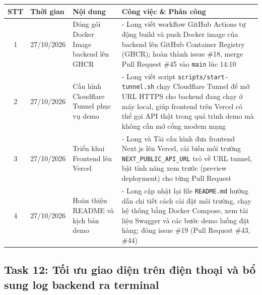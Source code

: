 \documentclass[12pt, a4paper]{article}
\begin{document}
\begin{tabularx}{\textwidth}{|c|p{3.2cm}|Y|Y|}
    \hline
    \textbf{STT} & \textbf{Thời gian} & \textbf{Nội dung} & \textbf{Công việc \& Phân công} \\
    \hline

    1 & 27/10/2026 & Đóng gói Docker Image backend lên GHCR &
    - Long viết workflow GitHub Actions tự động build và push Docker image của backend lên GitHub Container Registry (GHCR); hoàn thành issue \#18, merge Pull Request \#45 vào \texttt{main} lúc 14:10 \\
    \hline

    2 & 27/10/2026 & Cấu hình Cloudflare Tunnel phục vụ demo &
    - Long viết script \texttt{scripts/start-tunnel.sh} chạy Cloudflare Tunnel để mở URL HTTPS cho backend đang chạy ở máy local, giúp frontend trên Vercel có thể gọi API thật trong quá trình demo mà không cần mở cổng modem mạng \\
    \hline

    3 & 27/10/2026 & Triển khai Frontend lên Vercel &
    - Long và Tài cấu hình đưa frontend Next.js lên Vercel, cài biến môi trường \texttt{NEXT\_PUBLIC\_API\_URL} trỏ về URL tunnel, bật tính năng xem trước (preview deployment) cho từng Pull Request \\
    \hline

    4 & 27/10/2026 & Hoàn thiện README và kịch bản demo &
    - Long cập nhật lại file \texttt{README.md} hướng dẫn chi tiết cách cài đặt môi trường, chạy hệ thống bằng Docker Compose, xem tài liệu Swagger và các bước demo luồng đặt hàng; đóng issue \#19 (Pull Request \#43, \#44) \\
    \hline
\end{tabularx}

\vspace{0.8cm}

\subsection*{Task 12: Tối ưu giao diện trên điện thoại và bổ sung log backend ra terminal}
\end{document}
